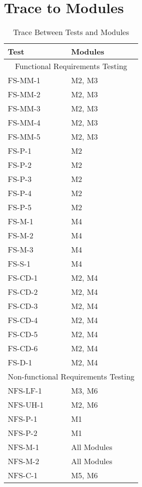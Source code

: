 \documentclass[12pt, titlepage]{article}
\begin{document}
\newpage
\section{Trace to Modules}		

\begin{table}[!htbp]
	\begin{tabular}{ll}
		\toprule
		Test & Modules \\
		\midrule
		\multicolumn{2}{c}{Functional Requirements Testing} \\
		\midrule
		FS-MM-1 & M2, M3 \\
		FS-MM-2 & M2, M3 \\
		FS-MM-3 & M2, M3 \\
		FS-MM-4 & M2, M3 \\
		FS-MM-5 & M2, M3 \\
		FS-P-1 & M2 \\
		FS-P-2 & M2 \\
		FS-P-3 & M2 \\
		FS-P-4 & M2 \\
		FS-P-5 & M2 \\
		FS-M-1 & M4 \\
		FS-M-2 & M4 \\
		FS-M-3 & M4 \\
		FS-S-1 & M4 \\
		FS-CD-1 & M2, M4 \\
		FS-CD-2 & M2, M4 \\
		FS-CD-3 & M2, M4 \\
		FS-CD-4 & M2, M4 \\
		FS-CD-5 & M2, M4 \\
		FS-CD-6 & M2, M4 \\
		FS-D-1 & M2, M4 \\
		\midrule
		\multicolumn{2}{c}{Non-functional Requirements Testing} \\
		\midrule
		NFS-LF-1 & M3, M6 \\
		NFS-UH-1 & M2, M6 \\
		NFS-P-1 & M1 \\
		NFS-P-2 & M1 \\
		NFS-M-1 & All Modules \\
		NFS-M-2 & All Modules \\
		NFS-C-1 & M5, M6 \\
		\bottomrule
	\end{tabular}
	\caption{Trace Between Tests and Modules}
	\makeatletter
	\def\rulecolor#1#{\CT@arc{#1}}
	\def\CT@arc#1#2{%
		\ifdim\baselineskip=\z@\noalign\fi
		{\gdef\CT@arc@{\color#1{#2}}}}
	\let\CT@arc@\relax
	\makeatother
	\label{Table}
\end{table}
\FloatBarrier
\end{document}
